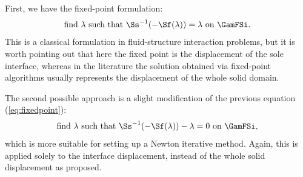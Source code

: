 First, we have the fixed-point formulation:
\begin{equation} \label{eq:fixedpoint}
\mbox{find } \lambda \mbox { such that } \Ss^{-1}(-\Sf(\lambda)) = \lambda
\mbox{ on } \GamFSi .
\end{equation}
This is a classical formulation in fluid-structure interaction problems, but it is worth pointing
out that here the fixed point is the displacement of the sole interface, whereas in the
literature the solution obtained via
fixed-point algorithms usually represents the displacement of the whole solid domain.

The second possible approach is a slight modification of the previous equation
(\ref{eq:fixedpoint}):
\begin{equation} \label{eq:newton}
\mbox{find } \lambda \mbox { such that } \Ss^{-1}(-\Sf(\lambda)) - \lambda = 0 \mbox{ on } \GamFSi,
\end{equation}
which is more suitable for setting up a Newton iterative method.
Again, this is applied solely to the interface displacement,
instead of the whole solid displacement as proposed.

